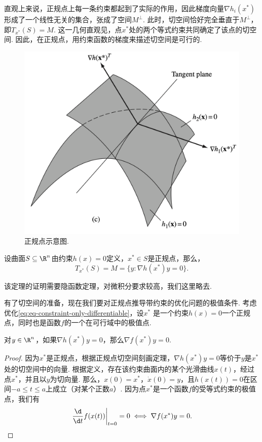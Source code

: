 直观上来说，正规点上每一条约束都起到了实际的作用，因此梯度向量$\nabla h_i({x^\ast})$形成了一个线性无关的集合，张成了空间$M^\perp$. 此时，切空间恰好完全垂直于$M^\perp$，即$T_{x^\ast}(S)=M$. 这一几何直观见，点${x^\ast }$处的两个等式约束共同确定了该点的切空间. 因此，在正规点，用约束函数的梯度来描述切空间是可行的. 
    \begin{figure}
        \centering
        \includegraphics[scale=0.17]{Figures/duality/tan-2constraint.png}
        \caption{正规点示意图. }
        \label{fig:tan-2constraint}
    \end{figure}

\begin{theorem}[正规点切空间刻画定理]
设曲面$S\subseteq\R^n$由约束$h(x)=0$定义，${x^\ast}\in S$是正规点，那么，
\[T_{x^\ast}(S)=M=\{{y:\nabla h(x^\ast)y=0}\}.\]
\end{theorem}
该定理的证明需要隐函数定理，对微积分要求较高，我们这里略去.

有了切空间的准备，现在我们要对正规点推导带约束的优化问题的极值条件. 考虑优化\eqref{eq:eq-constraint-only-differentiable}，设$x^\ast$ 是一个约束${h(x)=0}$一个正规点，同时也是函数$f$的一个在可行域中的极值点.

\begin{lemma}\label{lemma:eq-opt-cond-1}
对$y\in\R^n$，如果$\nabla {h(x^\ast)y=0}$，那么$\nabla f({x^\ast}){y}=0$.
\end{lemma}

\begin{proof}
因为$x^\ast$是正规点，根据正规点切空间刻画定理，$\nabla h(x^*)y=0$等价于$y$是${x^\ast}$处的切空间中的向量. 根据定义，存在该约束曲面内的某个光滑曲线${x}(t)$，经过点${x^\ast}$，并且以$y$为切向量. 那么，${x}(0)={x^\ast}$，${\dot{x}}(0)={y}$，且${h(x(t))=0}$在区间$-a\le t\le a$上成立（对某个正数$a$）. 因为点${x^\ast}$是一个函数$f$的受等式约束的极值点，我们有
\[\left.\frac{\d}{\d t}f({x}(t))\right|_{t=0}=0\iff \nabla f({x^\ast})y=0.\]
\end{proof}


